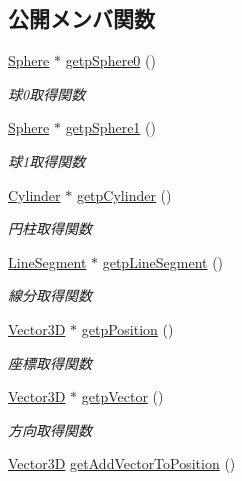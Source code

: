 \subsection*{公開メンバ関数}
\begin{DoxyCompactItemize}
\item 
\mbox{\hyperlink{class_sphere}{Sphere}} $\ast$ \mbox{\hyperlink{class_capsule_ad6590760125ad1b564bcd00fc9c0272e}{getp\+Sphere0}} ()
\begin{DoxyCompactList}\small\item\em 球0取得関数 \end{DoxyCompactList}\item 
\mbox{\hyperlink{class_sphere}{Sphere}} $\ast$ \mbox{\hyperlink{class_capsule_a3abd8375914c3ae6c5ff8ad585988d57}{getp\+Sphere1}} ()
\begin{DoxyCompactList}\small\item\em 球1取得関数 \end{DoxyCompactList}\item 
\mbox{\hyperlink{class_cylinder}{Cylinder}} $\ast$ \mbox{\hyperlink{class_capsule_a86fceb506f99d999cec56a5c316a5c7a}{getp\+Cylinder}} ()
\begin{DoxyCompactList}\small\item\em 円柱取得関数 \end{DoxyCompactList}\item 
\mbox{\hyperlink{class_line_segment}{Line\+Segment}} $\ast$ \mbox{\hyperlink{class_capsule_aadd6a7e5e20796e3f591b83cc406070e}{getp\+Line\+Segment}} ()
\begin{DoxyCompactList}\small\item\em 線分取得関数 \end{DoxyCompactList}\item 
\mbox{\hyperlink{class_vector3_d}{Vector3D}} $\ast$ \mbox{\hyperlink{class_capsule_ab0f3be95228fef65ef04d444aa5bcddd}{getp\+Position}} ()
\begin{DoxyCompactList}\small\item\em 座標取得関数 \end{DoxyCompactList}\item 
\mbox{\hyperlink{class_vector3_d}{Vector3D}} $\ast$ \mbox{\hyperlink{class_capsule_a93bb5298cb7f9f8ab27e08825bcb2f76}{getp\+Vector}} ()
\begin{DoxyCompactList}\small\item\em 方向取得関数 \end{DoxyCompactList}\item 
\mbox{\hyperlink{class_vector3_d}{Vector3D}} \mbox{\hyperlink{class_capsule_a32991dc5e0331f716302ce73a8f9fd2f}{get\+Add\+Vector\+To\+Position}} ()

\end{DoxyCompactItemize}
